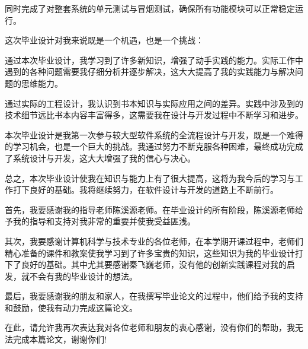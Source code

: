 \documentclass{HDU-Bachelor-Thesis}
\begin{document}
同时完成了对整套系统的单元测试与冒烟测试，确保所有功能模块可以正常稳定运行。

这次毕业设计对我来说既是一个机遇，也是一个挑战：

通过本次毕业设计，我学习到了许多新知识，增强了动手实践的能力。实际工作中遇到的各种问题需要我仔细分析并逐步解决，这大大提高了我的实践能力与解决问题的思维能力。

通过实际的工程设计，我认识到书本知识与实际应用之间的差异。实践中涉及到的技术细节远比书本内容丰富得多，这需要我在设计与开发过程中不断学习和进步。

本次毕业设计是我第一次参与较大型软件系统的全流程设计与开发，既是一个难得的学习机会，也是一个巨大的挑战。我通过努力不断克服各种困难，最终成功完成了系统设计与开发，这大大增强了我的信心与决心。

总之，本次毕业设计使我在知识与能力上有了很大提高，这将为我今后的学习与工作打下良好的基础。我将继续努力，在软件设计与开发的道路上不断前行。

\clearpage
{}

首先，我要感谢我的指导老师陈溪源老师。在毕业设计的所有阶段，陈溪源老师给予我的指导和支持对我非常的重要并使我受益匪浅。

其次，我要感谢计算机科学与技术专业的各位老师，在本学期开课过程中，老师们精心准备的课件和教案使我学习到了许多宝贵的知识，这些知识为我的毕业设计打下了良好的基础。其中尤其要感谢秦飞巍老师，没有他的创新实践课程对我的启发，就不会有我的毕业设计的想法。

最后，我要感谢我的朋友和家人，在我撰写毕业论文的过程中，他们给予我的支持和鼓励，使我有动力完成这篇论文。

在此，请允许我再次表达我对各位老师和朋友的衷心感谢，没有你们的帮助，我无法完成本篇论文，谢谢你们!

\clearpage

\end{document}
